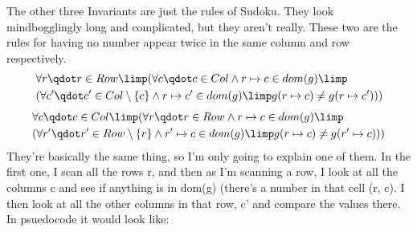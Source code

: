 \documentclass[a4paper]{article}
\begin{document}
The other three Invariants are just the rules of Sudoku. They look mindbogglingly long and complicated, but they aren't really. These two are the rules for having no number appear twice in the same column and row respectively.
\begin{align*}
& \forall  r \qdot  r \in  Row \limp  (\forall  c \qdot  c \in  Col \land  r \mapsto  c \in  dom(g)  \limp \\
&(\forall  c' \qdot  c' \in  Col\setminus \{ c\}  \land  r \mapsto  c' \in  dom(g) \limp  g(r \mapsto  c) \neq  g(r \mapsto  c')))
\end{align*}
\begin{align*}
 &\forall  c \qdot  c \in  Col \limp  (\forall  r \qdot  r \in  Row \land  r \mapsto  c \in  dom(g) \limp \\
&(\forall  r' \qdot  r' \in  Row\setminus \{ r\}  \land  r' \mapsto  c \in  dom(g) \limp  g(r \mapsto  c) \neq  g(r' \mapsto  c))) 
\end{align*}
They're basically the same thing, so I'm only going to explain one of them. In the first one, I scan all the rows r, and then as I'm scanning a row, I look at all the columns c and see if anything is in dom(g) (there's a number in that cell (r, c). I then look at all the other columns in that row, c' and compare the values there. In psuedocode it would look like:
\end{document}
